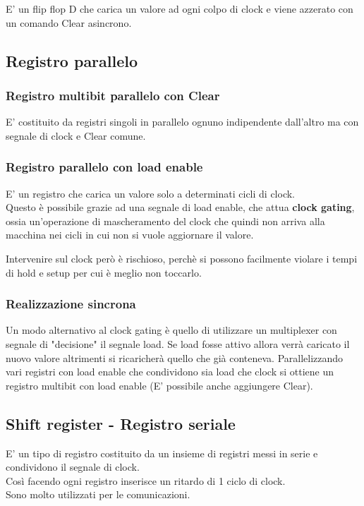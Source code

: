 \documentclass[a4paper]{book}
\begin{document}
E' un flip flop D che carica un valore ad ogni colpo di clock e viene azzerato con un comando Clear asincrono.
\subsection{Registro parallelo}

\subsubsection*{Registro multibit parallelo con Clear}

E' costituito da registri singoli in parallelo ognuno indipendente dall'altro ma con segnale di clock e Clear comune.

\subsubsection*{Registro parallelo con load enable}

E' un registro che carica un valore solo a determinati cicli di clock.\\
Questo è possibile grazie ad una segnale di load enable, che attua \textbf{clock gating}, ossia un'operazione di mascheramento del clock che quindi non arriva alla macchina nei cicli in cui non si vuole aggiornare il valore.

Intervenire sul clock però è rischioso, perchè si possono facilmente violare i tempi di hold e setup per cui è meglio non toccarlo.


\subsubsection*{Realizzazione sincrona}

Un modo alternativo al clock gating è quello di utilizzare un multiplexer con segnale di "decisione" il segnale load.
Se load fosse attivo allora verrà caricato il nuovo valore altrimenti si ricaricherà quello che già conteneva.
Parallelizzando vari registri con load enable che condividono sia load che clock si ottiene un registro multibit con load enable (E' possibile anche aggiungere Clear).

\subsection{Shift register - Registro seriale}

E' un tipo di registro costituito da un insieme di registri messi in serie e condividono il segnale di clock.
\\
Così facendo ogni registro inserisce un ritardo di 1 ciclo di clock.\\
Sono molto utilizzati per le comunicazioni.
\end{document}
